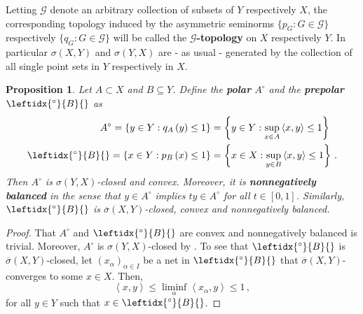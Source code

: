 \documentclass[
	paper=A4,
	pagesize=auto,
	fontsize=12pt
]{scrartcl}
\theoremstyle{plain}
\newtheorem{proposition}[theorem]{Proposition}
\theoremstyle{remark}
\theoremstyle{definition}
\begin{document}
Letting $\mathcal{G}$ denote an arbitrary collection of subsets of $Y$ respectively $X$, the corresponding topology induced by the asymmetric seminorms $\{ p_G : G \in \mathcal{G} \}$ respectively $\{ q_G : G \in \mathcal{G} \}$ will be called the \textbf{$\mathcal{G}$-topology} on $X$ respectively $Y$.
In particular $\sigma(X, Y)$ and $\sigma(Y, X)$ are - as usual - generated by the collection of all single point sets in $Y$ respectively in $X$.
%
\begin{proposition}
\label{prop:PolarProperties}
Let $A \subset X$ and $B \subseteq Y$.
Define the \textbf{polar} $A^\circ$ and the \textbf{prepolar} $\leftidx{^\circ}{B}{}$ as
%
\begin{equation}
\begin{aligned}
A^\circ = \left\{ y \in Y : q_A \left( y \right) \le 1 \right\} &= \left\{ y \in Y : \sup_{x \in A} \left< x, y \right> \le 1 \right\} \, \\
\leftidx{^\circ}{B}{} = \left\{ x \in Y : p_B \left( x \right) \le 1 \right\} &= \left\{ x \in X : \sup_{y \in B} \left< x, y \right> \le 1 \right\} \, .
\end{aligned}
\end{equation}
%
Then $A^\circ$ is $\sigma(Y, X)$-closed and convex.
Moreover, it is \textbf{nonnegatively balanced} in the sense that $y \in A^\circ$ implies $t y \in A^\circ$ for all $t \in [0, 1]$.
Similarly, $\leftidx{^\circ}{B}{}$ is $\overline{\sigma}(X, Y)$-closed, convex and nonnegatively balanced.
\end{proposition}
\begin{proof}
That $A^\circ$ and $\leftidx{^\circ}{B}{}$ are convex and nonnegatively balanced is trivial.
Moreover, $A^\circ$ is $\sigma(Y, X)$-closed by \cite[Proposition 2.4.29]{src:Cobzaş:FunctionalAnalysisinAsymmetricNormedSpaces}.
To see that $\leftidx{^\circ}{B}{}$ is $\overline{\sigma}(X, Y)$-closed, let $(x_\alpha)_{\alpha \in I}$ be a net in $\leftidx{^\circ}{B}{}$ that $\overline{\sigma}(X, Y)$-converges to some $x \in X$.
Then,
%
\begin{equation}
\left< x, y \right>
\le
\liminf_{\alpha} \left< x_\alpha, y \right>
\le
1 \, ,
\end{equation}
%
for all $y \in Y$ such that $x \in \leftidx{^\circ}{B}{}$.
\end{proof}
\end{document}
